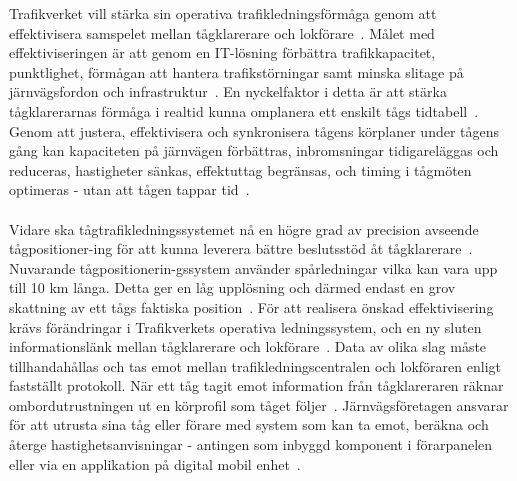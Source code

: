 Trafikverket vill stärka sin operativa trafikledningsförmåga genom att effektivisera samspelet mellan tågklarerare och lokförare~\cite{Angel2020}.
Målet med effektiviseringen är att genom en IT-lösning förbättra trafikkapacitet, punktlighet, förmågan att hantera trafikstörningar samt minska slitage på järnvägsfordon och infrastruktur~\cite{Angel2020, Joborn2023, Lindmark2022, Systemdefinition2019}.
En nyckelfaktor i detta är att stärka tågklarerarnas förmåga i realtid kunna omplanera ett enskilt tågs tidtabell~\cite{Joborn2023}.
Genom att justera, effektivisera och synkronisera tågens körplaner under tågens gång kan kapaciteten på järnvägen förbättras, inbromsningar tidigareläggas och reduceras, hastigheter sänkas, effektuttag begränsas, och timing i tågmöten optimeras - utan att tågen tappar tid~\cite{Angel2020, Joborn2023, Ketech2022, Lindmark2022, Olsson2023, Yao2022}.
\paragraph{}
\hspace{-14pt}
Vidare ska tågtrafikledningssystemet nå en högre grad av precision avseende tågpositioner-ing för att kunna leverera bättre beslutsstöd åt tågklarerare~\cite{Systemdefinition2019}.
Nuvarande tågpositionerin-gssystem använder spårledningar vilka kan vara upp till 10 km långa.
Detta ger en låg upplösning och därmed endast en grov skattning av ett tågs faktiska position~\cite{Systemdefinition2019}.
För att realisera önskad effektivisering krävs förändringar i Trafikverkets operativa ledningssystem, och en ny sluten informationslänk mellan tågklarerare och lokförare~\cite{Joborn2023, Systemdefinition2019}.
Data av olika slag måste tillhandahållas och tas emot mellan trafikledningscentralen och lokföraren enligt fastställt protokoll.
När ett tåg tagit emot information från tågklareraren räknar ombordutrustningen ut en körprofil som tåget följer~\cite{Joborn2023}.
Järnvägsföretagen ansvarar för att utrusta sina tåg eller förare med system som kan ta emot, beräkna och återge hastighetsanvisningar - antingen som inbyggd komponent i förarpanelen eller via en applikation på digital mobil enhet~\cite{Joborn2023}.

